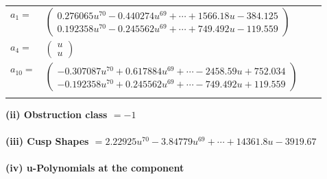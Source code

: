 \documentclass[1p]{elsarticle_modified}
\theoremstyle{definition}
\begin{document}
\begin{tabular}{m{7pt} m{180pt} m{7pt} m{180pt} }
\flushright $a_{1}=$&$\begin{pmatrix}0.276065 u^{70}-0.440274 u^{69}+\cdots+1566.18 u-384.125\\0.192358 u^{70}-0.245562 u^{69}+\cdots+749.492 u-119.559\end{pmatrix}$ \\
\flushright $a_{4}=$&$\begin{pmatrix}u\\u\end{pmatrix}$ \\
\flushright $a_{10}=$&$\begin{pmatrix}-0.307087 u^{70}+0.617884 u^{69}+\cdots-2458.59 u+752.034\\-0.192358 u^{70}+0.245562 u^{69}+\cdots-749.492 u+119.559\end{pmatrix}$\\&\end{tabular}
\flushleft \textbf{(ii) Obstruction class $= -1$}\\~\\
\flushleft \textbf{(iii) Cusp Shapes $= 2.22925 u^{70}-3.84779 u^{69}+\cdots+14361.8 u-3919.67$}\\~\\
\newpage\renewcommand{\arraystretch}{1}
\flushleft \textbf{(iv) u-Polynomials at the component}\newline \\
\end{document}
